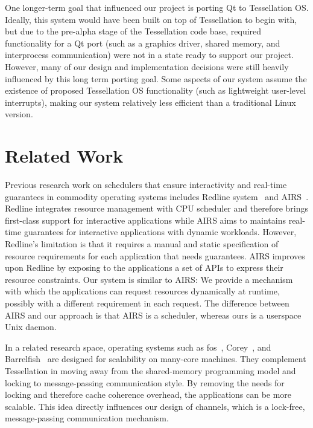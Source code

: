 \documentclass[letterpaper,twocolumn,11pt]{article}
\begin{document}
One longer-term goal that influenced our project is porting Qt to Tessellation OS. Ideally, this system would have been built on top of Tessellation to begin with, but due to the pre-alpha stage of the Tessellation code base, required functionality for a Qt port (such as a graphics driver, shared memory, and interprocess communication) were not in a state ready to support our project. However, many of our design and implementation decisions were still heavily influenced by this long term porting goal. Some aspects of our system assume the existence of proposed Tessellation OS functionality (such as lightweight user-level interrupts), making our system relatively less efficient than a traditional Linux version.

\section{Related Work}

Previous research work on schedulers that ensure interactivity and real-time guarantees in commodity operating systems includes Redline system~\cite{DBLP:conf/osdi/YangLBKM08} and AIRS~\cite{kato:airs:}. Redline integrates resource management with CPU scheduler and therefore brings first-class support for interactive applications while AIRS aims to maintains real-time guarantees for interactive applications with dynamic workloads. However, Redline's limitation is that it requires a manual and static specification of resource requirements for each application that needs guarantees. AIRS improves upon Redline by exposing to the applications a set of APIs to express their resource constraints. Our system is similar to AIRS: We provide a mechanism with which the applications can request resources dynamically at runtime, possibly with a different requirement in each request. The difference between AIRS and our approach is that AIRS is a scheduler, whereas ours is a userspace Unix daemon.

In a related research space, operating systems such as fos~\cite{Wentzlaff:2009:FOS:1531793.1531805}, Corey~\cite{Boyd-Wickizer:2008:COS:1855741.1855745}, and Barrelfish~\cite{Schüpbach08embracingdiversity} are designed for scalability on many-core machines. They complement Tessellation in moving away from the shared-memory programming model and locking to message-passing communication style. By removing the needs for locking and therefore cache coherence overhead, the applications can be more scalable. This idea directly influences our design of channels, which is a lock-free, message-passing communication mechanism.
\end{document}
